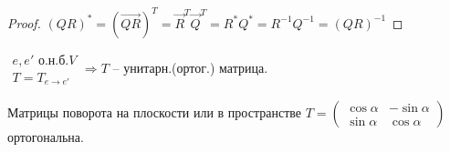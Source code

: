 \documentclass[../main.tex]{subfiles}
\begin{document}
\begin{mylist}
	\begin{proof}
		$(QR)^* = (\vec{QR})^T = \vec R^T \vec Q^T = R^* Q^* = R^{-1} Q^{-1} = (QR)^{-1}$
	\end{proof}
	\item $\begin{matrix}
		e, e' \text{ о.н.б.} V\\
		T = T_{e\rightarrow e'}
	\end{matrix} \Rightarrow T$ -- унитарн.(ортог.) матрица.
	\begin{examples}
		Матрицы поворота на плоскости или в пространстве\n
		$T = \begin{pmatrix}
			\cos \alpha & - \sin \alpha\\
			\sin \alpha & \cos \alpha
		\end{pmatrix}$ ортогональна.
	\end{examples}
	\end{mylist}
\end{document}
